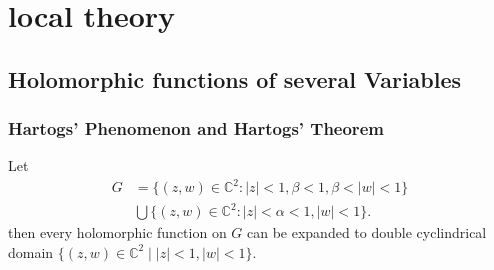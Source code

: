 \chapter{local theory}
\section{Holomorphic functions of several Variables}
\subsection{Hartogs' Phenomenon and Hartogs' Theorem}
\begin{example}
Let 
\begin{align*}
G &=\{(z,w)\in \mathbb{C}^2 : |z|<1,\beta<1,\beta <|w|<1\}\\
&\bigcup \{(z,w)\in\mathbb{C}^2 : |z|<\alpha<1,|w|<1\}.
\end{align*}
then every holomorphic function on $G$ can be expanded to double cyclindrical domain $\{(z,w)\in \mathbb{C}^2 \mid  |z|<1,|w|<1\}$.
\end{example}
